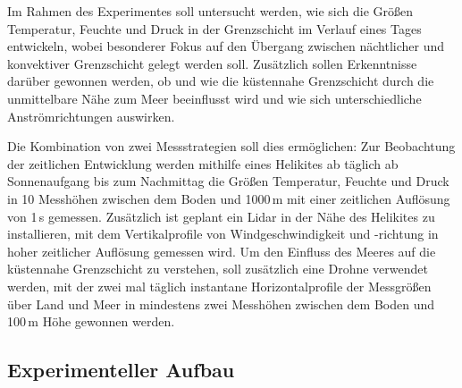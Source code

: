 \documentclass[a4paper,11pt,DIV=calc,tablecaptionabove,headinclude,twoside]{article}
\begin{document}
Im Rahmen des Experimentes soll untersucht werden, wie sich die Größen Temperatur, Feuchte und Druck in der Grenzschicht im Verlauf eines Tages entwickeln, wobei besonderer Fokus auf den Übergang zwischen nächtlicher und konvektiver Grenzschicht gelegt werden soll. Zusätzlich sollen Erkenntnisse darüber gewonnen werden, ob und wie die küstennahe Grenzschicht durch die unmittelbare Nähe zum Meer beeinflusst wird und wie sich unterschiedliche Anströmrichtungen auswirken. 

Die Kombination von zwei Messstrategien soll dies ermöglichen: Zur Beobachtung der zeitlichen Entwicklung werden mithilfe eines Helikites ab täglich ab Sonnenaufgang bis zum Nachmittag die Größen Temperatur, Feuchte und Druck in 10 Messhöhen zwischen dem Boden und 1000\,m mit einer zeitlichen Auflösung von 1\,s gemessen.
Zusätzlich ist geplant ein Lidar in der Nähe des Helikites zu installieren, mit dem Vertikalprofile von Windgeschwindigkeit und -richtung in hoher zeitlicher Auflösung gemessen wird. %
Um den Einfluss des Meeres auf die küstennahe Grenzschicht zu verstehen, soll zusätzlich eine Drohne verwendet werden, mit der zwei mal täglich instantane Horizontalprofile der Messgrößen über Land und Meer in mindestens zwei Messhöhen zwischen dem Boden und 100\,m Höhe gewonnen werden. 

\subsection{Experimenteller Aufbau}
\label{Aufbau}
%
%
%
\end{document}

